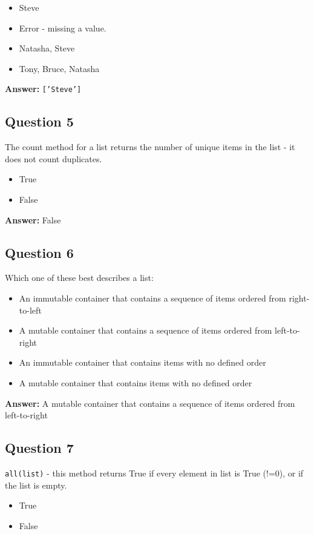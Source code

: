 \documentclass{article}
\begin{document}
\begin{itemize}
    \item Steve
    \item Error - missing a value.
    \item Natasha, Steve
    \item Tony, Bruce, Natasha
\end{itemize}

\textbf{Answer:} \texttt{['Steve']}

\subsection*{Question 5}
The count method for a list returns the number of unique items in the list - it does not count duplicates.
\begin{itemize}
    \item True
    \item False
\end{itemize}

\textbf{Answer:} False

\subsection*{Question 6}
Which one of these best describes a list:
\begin{itemize}
    \item An immutable container that contains a sequence of items ordered from right-to-left
    \item A mutable container that contains a sequence of items ordered from left-to-right
    \item An immutable container that contains items with no defined order
    \item A mutable container that contains items with no defined order
\end{itemize}

\textbf{Answer:} A mutable container that contains a sequence of items ordered from left-to-right

\subsection*{Question 7}
\texttt{all(list)} - this method returns True if every element in list is True (!=0), or if the list is empty.
\begin{itemize}
    \item True
    \item False
\end{itemize}
\end{document}
